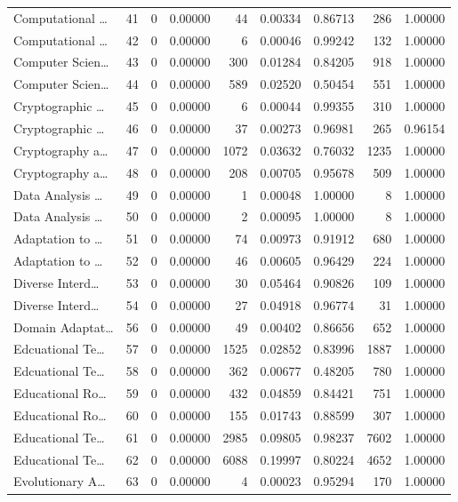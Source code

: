 \begin{table}
\begin{tabular}{lrrrrrrrr}
Computational … & 41 & 0 & 0.00000 & 44 & 0.00334 & 0.86713 & 286 & 1.00000 \\
Computational … & 42 & 0 & 0.00000 & 6 & 0.00046 & 0.99242 & 132 & 1.00000 \\
Computer Scien… & 43 & 0 & 0.00000 & 300 & 0.01284 & 0.84205 & 918 & 1.00000 \\
Computer Scien… & 44 & 0 & 0.00000 & 589 & 0.02520 & 0.50454 & 551 & 1.00000 \\
Cryptographic … & 45 & 0 & 0.00000 & 6 & 0.00044 & 0.99355 & 310 & 1.00000 \\
Cryptographic … & 46 & 0 & 0.00000 & 37 & 0.00273 & 0.96981 & 265 & 0.96154 \\
Cryptography a… & 47 & 0 & 0.00000 & 1072 & 0.03632 & 0.76032 & 1235 & 1.00000 \\
Cryptography a… & 48 & 0 & 0.00000 & 208 & 0.00705 & 0.95678 & 509 & 1.00000 \\
Data Analysis … & 49 & 0 & 0.00000 & 1 & 0.00048 & 1.00000 & 8 & 1.00000 \\
Data Analysis … & 50 & 0 & 0.00000 & 2 & 0.00095 & 1.00000 & 8 & 1.00000 \\
Adaptation to … & 51 & 0 & 0.00000 & 74 & 0.00973 & 0.91912 & 680 & 1.00000 \\
Adaptation to … & 52 & 0 & 0.00000 & 46 & 0.00605 & 0.96429 & 224 & 1.00000 \\
Diverse Interd… & 53 & 0 & 0.00000 & 30 & 0.05464 & 0.90826 & 109 & 1.00000 \\
Diverse Interd… & 54 & 0 & 0.00000 & 27 & 0.04918 & 0.96774 & 31 & 1.00000 \\
Domain Adaptat… & 56 & 0 & 0.00000 & 49 & 0.00402 & 0.86656 & 652 & 1.00000 \\
Edcuational Te… & 57 & 0 & 0.00000 & 1525 & 0.02852 & 0.83996 & 1887 & 1.00000 \\
Edcuational Te… & 58 & 0 & 0.00000 & 362 & 0.00677 & 0.48205 & 780 & 1.00000 \\
Educational Ro… & 59 & 0 & 0.00000 & 432 & 0.04859 & 0.84421 & 751 & 1.00000 \\
Educational Ro… & 60 & 0 & 0.00000 & 155 & 0.01743 & 0.88599 & 307 & 1.00000 \\
Educational Te… & 61 & 0 & 0.00000 & 2985 & 0.09805 & 0.98237 & 7602 & 1.00000 \\
Educational Te… & 62 & 0 & 0.00000 & 6088 & 0.19997 & 0.80224 & 4652 & 1.00000 \\
Evolutionary A… & 63 & 0 & 0.00000 & 4 & 0.00023 & 0.95294 & 170 & 1.00000 \\

\end{tabular}
\end{table}
